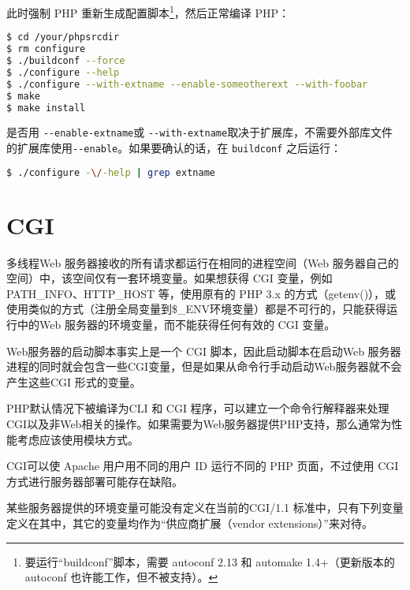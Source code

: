 此时强制 PHP 重新生成配置脚本\footnote{要运行“buildconf”脚本，需要 autoconf 2.13 和 automake 1.4+（更新版本的 autoconf 也许能工作，但不被支持）。}，然后正常编译 PHP：

\begin{lstlisting}[language=bash]
$ cd /your/phpsrcdir 
$ rm configure
$ ./buildconf --force
$ ./configure --help
$ ./configure --with-extname --enable-someotherext --with-foobar
$ make
$ make install
\end{lstlisting}


是否用 \texttt{-\/-enable-extname}或 \texttt{-\/-with-extname}取决于扩展库，不需要外部库文件的扩展库使用\texttt{-\/-enable}。如果要确认的话，在 \texttt{buildconf} 之后运行：

\begin{lstlisting}[language=bash]
$ ./configure -\/-help | grep extname
\end{lstlisting}

\section{CGI}

多线程Web 服务器接收的所有请求都运行在相同的进程空间（Web 服务器自己的空间）中，该空间仅有一套环境变量。如果想获得 CGI 变量，例如 PATH\_INFO、HTTP\_HOST 等，使用原有的 PHP 3.x 的方式（getenv()），或使用类似的方式（注册全局变量到\$\_ENV环境变量）都是不可行的，只能获得运行中的Web 服务器的环境变量，而不能获得任何有效的 CGI 变量。

Web服务器的启动脚本事实上是一个 CGI 脚本，因此启动脚本在启动Web 服务器进程的同时就会包含一些CGI变量，但是如果从命令行手动启动Web服务器就不会产生这些CGI 形式的变量。

PHP默认情况下被编译为CLI 和 CGI 程序，可以建立一个命令行解释器来处理CGI以及非Web相关的操作。如果需要为Web服务器提供PHP支持，那么通常为性能考虑应该使用模块方式。

CGI可以使 Apache 用户用不同的用户 ID 运行不同的 PHP 页面，不过使用 CGI 方式进行服务器部署可能存在缺陷。

某些服务器提供的环境变量可能没有定义在当前的CGI/1.1 标准中，只有下列变量定义在其中，其它的变量均作为“供应商扩展（vendor extensions）”来对待。

